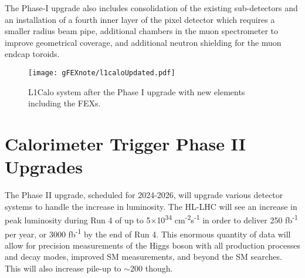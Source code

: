 %

The Phase-I upgrade also includes consolidation of the existing sub-detectors and an installation of a fourth inner layer of the pixel detector which requires a smaller radius beam pipe, additional chambers in the muon spectrometer to improve geometrical coverage, and additional neutron shielding for the muon endcap toroids.  \\

\begin{figure} [h!]
\texttt{[image: gFEXnote/l1caloUpdated.pdf]} %
\caption{L1Calo system after the Phase I upgrade with new elements including the FEXs.  }
\end{figure}

\section{Calorimeter Trigger Phase II Upgrades}

The Phase II upgrade, scheduled for 2024-2026, will upgrade various detector systems to handle the increase in luminosity.  The HL-LHC will see an increase in peak luminosity during Run 4 of up to 5$\times$10\textsuperscript{34} cm\textsuperscript{-2}s\textsuperscript{-1} in order to deliver 250 fb\textsuperscript{-1} per year, or 3000 fb\textsuperscript{-1} by the end of Run 4.  This enormous quantity of data will allow for precision measurements of the Higgs boson with all production processes and decay modes, improved SM measurements, and beyond the SM searches. This will also increase pile-up to $\sim$200 though.  \\ %

